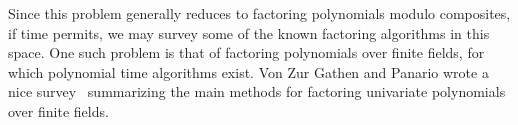 \documentclass[letterpaper,twocolumn,10pt]{article}
\begin{document}
Since this problem generally reduces to factoring polynomials modulo composites, if time permits, we may survey some of the known factoring algorithms in this space. One such problem is that of factoring polynomials over finite fields, for which polynomial time algorithms exist. Von Zur Gathen and Panario wrote a nice survey~\cite{Gathen} summarizing the main methods for factoring univariate polynomials over finite fields. 



{\footnotesize 
}


\end{document}
